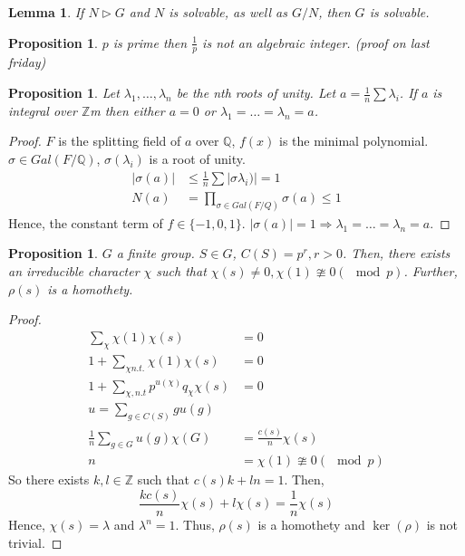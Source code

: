 \documentclass[letterpaper, leqno, 12pt]{article}
\newcommand{\bZ}{\mathbb{Z}}
\newcommand{\bQ}{\mathbb{Q}}
\theoremstyle{stdthm}
\newtheorem{lem}[thm]{Lemma}
\newtheorem{prop}[thm]{Proposition}
\theoremstyle{stddef}
\theoremstyle{stdnonum}
\theoremstyle{stdqands}
\theoremstyle{stdbold}
\begin{document}
\begin{lem}
If $N \rhd G$ and $N$ is solvable, as well as $G/N$, then $G$ is solvable. 
\end{lem}

\begin{prop}
$p$ is prime then $\frac{1}{p}$ is not an algebraic integer. (proof on last friday)
\end{prop}

\begin{prop}
Let $\lambda_1,\dots, \lambda_n$ be the nth roots of unity. Let $a = \frac{1}{n} \sum \lambda_i$. If $a$ is integral over $\bZ$m then either $a = 0$ or $\lambda_1 = \dots = \lambda_n = a$. 
\end{prop}

\begin{proof}
$F$ is the splitting field of $a$ over $\bQ$, $f(x)$ is the minimal polynomial. $\sigma \in Gal(F/\bQ)$, $\sigma(\lambda_i)$ is a root of unity. 
\begin{align*}
|\sigma(a)| &\leq \frac{1}{n} \sum |\sigma\lambda_i)| = 1\\
N(a) &= \prod_{\sigma \in Gal(F/Q)} \sigma(a) \leq 1
\end{align*}
Hence, the constant term of $f \in \{-1,0,1\}$. $|\sigma(a)|= 1 \Rightarrow \lambda_1 = \dots = \lambda_n = a$. 

\end{proof}

\begin{prop}
$G$ a finite group. $S \in G$, $C(S) = p^r, r>0$. Then, there exists an irreducible character $\chi$ such that $\chi(s) \neq 0, \chi(1) \ncong 0(\mod p)$. Further, $\rho(s)$ is a homothety.
\end{prop}

\begin{proof}
\begin{align*}
\sum_\chi \chi(1) \chi(s) &= 0 \\
1 + \sum_{\chi n.t.} \chi(1) \chi(s) &= 0\\
1+ \sum_{\chi,n.t} p^{u(\chi)}q_\chi \chi(s) &=0 \\
u = \sum_{g \in C(S)} g u(g)\\
\frac{1}{n} \sum_{g \in G} u(g) \chi(G) &= \frac{c(s)}{n}\chi(s)\\
n &= \chi(1) \ncong 0 (\mod p)
\end{align*}
So there exists $k,l \in \bZ$ such that $c(s)k + ln = 1$. Then,
\[ \frac{kc(s)}{n} \chi(s) + l\chi(s) = \frac{1}{n} \chi(s) \]
Hence, $\chi(s)= \lambda$ and $\lambda^n = 1$. Thus, $\rho(s)$ is a homothety and $\ker(\rho)$ is not trivial. 
\end{proof}
\end{document}
